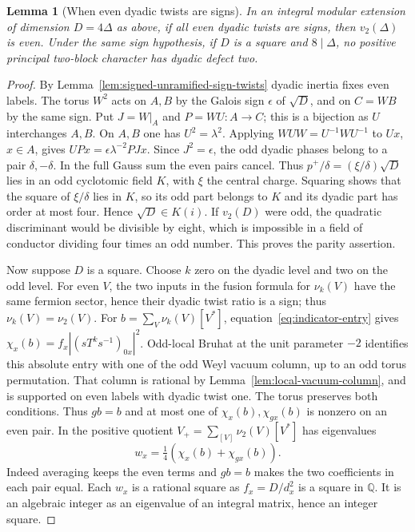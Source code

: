 \documentclass[11pt,a4paper]{article}
\numberwithin{equation}{section}
\newtheorem{lemma}[theorem]{Lemma}
\theoremstyle{remark}
\newcommand{\QQ}{\mathbb Q}
\begin{document}
\begin{lemma}[When even dyadic twists are signs]\label{fam:Q:5.9}
In an integral modular extension of dimension $D=4\Delta$ as above,
if all even dyadic twists are signs, then $v_2(\Delta)$ is even.
Under the same sign hypothesis, if $D$ is a square and $8\mid\Delta$, no positive principal
two-block character has dyadic defect two.
\end{lemma}
\begin{proof}
By Lemma~\ref{lem:signed-unramified-sign-twists} dyadic inertia
fixes even labels. The torus $W^2$ acts on $A,B$ by the Galois
sign $\epsilon$ of $\sqrt D$, and on $C=WB$ by the same sign.
Put $J=W|_A$ and $P=WU:A\to C$; this is a bijection as $U$
interchanges $A,B$. On $A,B$ one has $U^2=\lambda^2$. Applying
$WUW=U^{-1}WU^{-1}$ to $Ux$, $x\in A$, gives
$UPx=\epsilon\lambda^{-2}PJx$. Since $J^2=\epsilon$, the odd
dyadic phases belong to a pair $\delta,-\delta$. In the full
Gauss sum the even pairs cancel. Thus
$p^+/\delta=(\xi/\delta)\sqrt D$ lies in an odd cyclotomic field
$K$, with $\xi$ the central charge. Squaring shows that the square
of $\xi/\delta$ lies in $K$, so its odd part belongs to $K$ and
its dyadic part has order at most four. Hence $\sqrt D\in K(i)$.
If $v_2(D)$ were odd, the quadratic discriminant would be divisible
by eight, which is impossible in a field of conductor dividing
four times an odd number. This proves the parity assertion.

Now suppose $D$ is a square. Choose $k$ zero on the dyadic level
and two on the odd level. For even $V$, the two inputs in the
fusion formula for $\nu_k(V)$ have the same fermion sector, hence
their dyadic twist ratio is a sign; thus $\nu_k(V)=\nu_2(V)$.
For $b=\sum_V\nu_k(V)[V^*]$, equation~\eqref{eq:indicator-entry}
gives $\chi_x(b)=f_x|(sT^ks^{-1})_{0x}|^2$. Odd-local Bruhat at
the unit parameter $-2$ identifies this absolute entry with one
of the odd Weyl vacuum column, up to an odd torus permutation.
That column is rational by Lemma~\ref{lem:local-vacuum-column},
and is supported on even labels with dyadic twist one. The torus
preserves both conditions. Thus $gb=b$ and at most one of
$\chi_x(b),\chi_{gx}(b)$ is nonzero on an even pair.
In the positive quotient
$V_+=\sum_{[V]}\nu_2(V)[V^*]$ has eigenvalues
\[
 w_x=\tfrac14(\chi_x(b)+\chi_{gx}(b)).
\]
Indeed averaging keeps the even terms and $gb=b$ makes the two
coefficients in each pair equal. Each $w_x$ is a rational square
as $f_x=D/d_x^2$ is a square in $\QQ$. It is an algebraic integer
as an eigenvalue of an integral matrix, hence an integer square.


\end{proof}
\end{document}
